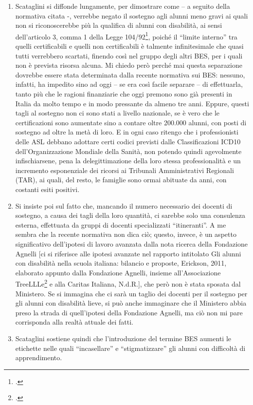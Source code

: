 \begin{enumerate}
	\item Scataglini si diffonde lungamente, per dimostrare come – a seguito della normativa citata -, verrebbe negato il sostegno agli alunni meno gravi ai quali non si riconoscerebbe più la qualifica di alunni con disabilità, ai sensi dell'articolo 3, comma 1 della Legge 104/92\footcite{Legge_104_92}, poiché il “limite interno” tra quelli certificabili e quelli non certificabili è talmente infinitesimale che quasi tutti verrebbero scartati, finendo così nel gruppo degli altri BES, per i quali non è prevista risorsa alcuna.
	Mi chiedo però perché mai questa separazione dovrebbe essere stata determinata dalla recente normativa sui BES: nessuno, infatti, ha impedito sino ad oggi – se era così facile separare – di effettuarla, tanto più che le ragioni finanziarie che oggi premono sono già presenti in Italia da molto tempo e in modo pressante da almeno tre anni. Eppure, questi tagli al sostegno non ci sono stati a livello nazionale, se è vero che le certificazioni sono aumentate sino a contare oltre 200.000 alunni, con posti di sostegno ad oltre la metà di loro.
	E in ogni caso ritengo che i professionisti delle ASL debbano adottare certi codici previsti dalle Classificazioni ICD10 dell'Organizzazione Mondiale della Sanità, non potendo quindi agevolmente infischiarsene, pena la delegittimazione della loro stessa professionalità e un incremento esponenziale dei ricorsi ai Tribunali Amministrativi Regionali (TAR), ai quali, del resto, le famiglie sono ormai abituate da anni, con costanti esiti positivi.
	\item Si insiste poi sul fatto che, mancando il numero necessario dei docenti di sostegno, a causa dei tagli della loro quantità, ci sarebbe solo una consulenza esterna, effettuata da gruppi di docenti specializzati “itineranti”.
	A me sembra che la recente normativa non dica ciò; questo, invece, è un aspetto significativo dell'ipotesi di lavoro avanzata dalla nota ricerca della Fondazione Agnelli [ci si riferisce alle ipotesi avanzate nel rapporto intitolato Gli alunni con disabilità nella scuola italiana: bilancio e proposte, Erickson, 2011, elaborato appunto dalla Fondazione Agnelli, insieme all'Associazione TreeLLLe\footcite{treellle2011alunni} e alla Caritas Italiana, N.d.R.], che però non è stata sposata dal Ministero. Se si immagina che ci sarà un taglio dei docenti per il sostegno per gli alunni con disabilità lieve, si può anche immaginare che il Ministero abbia preso la strada di quell'ipotesi della Fondazione Agnelli, ma ciò non mi pare corrisponda alla realtà attuale dei fatti.
	\item Scataglini sostiene quindi che l'introduzione del termine BES aumenti le etichette nelle quali “incasellare” e “stigmatizzare” gli alunni con difficoltà di apprendimento.
\end{enumerate}
